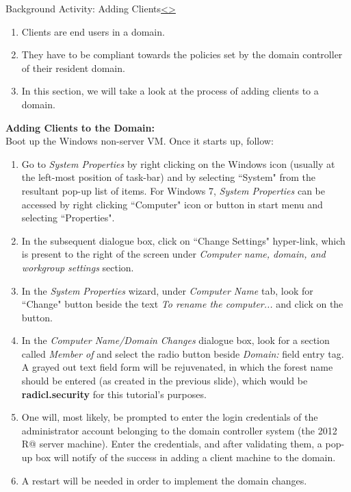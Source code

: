 \documentclass[12pt]{extarticle}
\newenvironment{instructionblock}{\Large\bgroup}{\egroup}
\begin{document}


\pagebreak
\begin{slide}{Background Activity: Adding Clients}{\hyperref[slide 12]{\textless}\hyperref[slide 14]{\textgreater}}
\begin{instructionblock}
\begin{enumerate}
\item Clients are end users in a domain. 
\item They have to be compliant towards the policies set by the domain controller of their resident domain.
\item In this section, we will take a look at the process of adding clients to a domain.
\end{enumerate}

\end{instructionblock}
\end{slide} 

\noindent
{\textbf{Adding Clients to the Domain:}}\\
Boot up the Windows non-server VM. Once it starts up, follow:

\begin{enumerate}
\item Go to \textit{System Properties} by right clicking on the Windows icon (usually at the left-most position of task-bar) and by selecting ``System" from the resultant pop-up list of items. For Windows 7, \textit{System Properties} can be accessed by right clicking ``Computer" icon or button in start menu and selecting ``Properties".  
\item In the subsequent dialogue box, click on ``Change Settings" hyper-link, which is present to the right of the screen under \textit{Computer name, domain, and workgroup settings} section. 
\item In the \textit{System Properties} wizard, under \textit{Computer Name} tab, look for ``Change" button beside the text \textit{To rename the computer...} and click on the button.
\item In the \textit{Computer Name/Domain Changes} dialogue box, look for a section called \textit{Member of} and select the radio button beside \textit{Domain:} field entry tag. A grayed out text field form will be rejuvenated, in which the forest name should be entered (as created in the previous slide), which would be \textbf{radicl.security} for this tutorial's purposes.
\item One will, most likely, be prompted to enter the login credentials of the administrator account belonging to the domain controller system (the 2012 R@ server machine). Enter the credentials, and after validating them, a pop-up box will notify of the success in adding a client machine to the domain.
\item A restart will be needed in order to implement the domain changes.
\end{enumerate}
\end{document}
